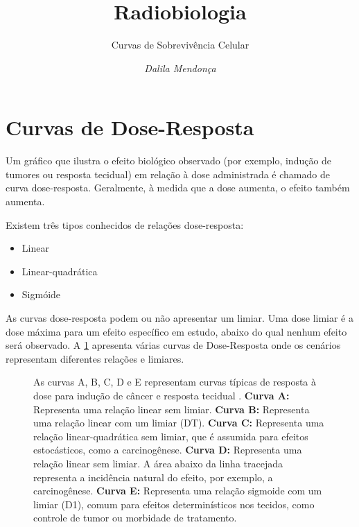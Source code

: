\documentclass[11pt,a4paper]{article}
\title{\LobsterTwo\Huge{Radiobiologia}}
\author{\LobsterTwo\Large{Curvas de Sobrevivência Celular}\nocite{*}}
\date{\LobsterTwo\textit{Dalila Mendonça}}
\newcounter{exemplo}
\begin{document}
	\maketitle

\section{Curvas de Dose-Resposta}


	Um gráfico que ilustra o efeito biológico observado (por exemplo, indução de tumores ou resposta tecidual) em relação à dose administrada é chamado de curva dose-resposta. Geralmente, à medida que a dose aumenta, o efeito também aumenta.

	Existem três tipos conhecidos de relações dose-resposta:
	\begin{itemize}
		\item Linear
		\item Linear-quadrática
		\item Sigmóide
	\end{itemize}

	As curvas dose-resposta podem ou não apresentar um limiar. Uma dose limiar é a dose máxima para um efeito específico em estudo, abaixo do qual nenhum efeito será observado. A \ref{fig:curvasDeDoseResposta} apresenta várias curvas de Dose-Resposta onde os cenários representam diferentes relações e limiares.

	\begin{figure}[h]
		\centering
		\caption{As curvas A, B, C, D e E representam curvas típicas de resposta à dose para indução de câncer e resposta tecidual . \textbf{Curva A:} Representa uma relação linear sem limiar. \textbf{Curva B:} Representa uma relação linear com um limiar (DT). \textbf{Curva C:} Representa uma relação linear-quadrática sem limiar, que é assumida para efeitos estocásticos, como a carcinogênese. \textbf{Curva D:} Representa uma relação linear sem limiar. A área abaixo da linha tracejada representa a incidência natural do efeito, por exemplo, a carcinogênese. \textbf{Curva E:} Representa uma relação sigmoide com um limiar (D1), comum para efeitos determinísticos nos tecidos, como controle de tumor ou morbidade de tratamento.}
		\label{fig:curvasDeDoseResposta}
	\end{figure}
 
\end{document}
